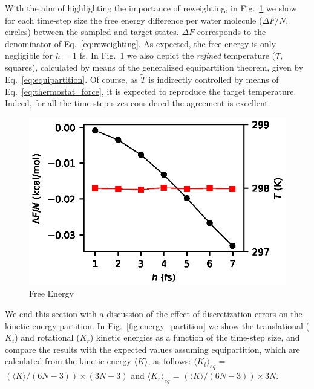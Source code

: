 \documentclass[
journal=jctcce,
layout=twocolumn
]{achemso}
\newcommand{\refined}[1]{\widetilde{#1}}
\begin{document}
With the aim of highlighting the importance of reweighting, in Fig.~\ref{fig:free_energy} we show for each time-step size the free energy difference per water molecule ($\Delta F/N$, circles) between the sampled and target states.
$\Delta F$ corresponds to the denominator of Eq.~\ref{eq:reweighting}.
As expected, the free energy is only negligible for $h$ = 1 fs.
In Fig.~\ref{fig:free_energy} we also depict the \textit{refined} temperature ($\refined{T}$, squares), calculated by means of the generalized equipartition theorem, given by Eq.~\ref{eq:equipartition}.
Of course, as $\refined{T}$ is indirectly controlled by means of Eq.~\ref{eq:thermostat_force}, it is expected to reproduce the target temperature.
Indeed, for all the time-step sizes considered the agreement is excellent.

\begin{figure}
	\includegraphics{Figures/Free_Energy.eps}
	\caption{Free Energy}
	\label{fig:free_energy}
\end{figure}

We end this section with a discussion of the effect of discretization errors on the kinetic energy partition.
In Fig.~\ref{fig:energy_partition} we show the translational ($K_t$) and rotational ($K_r$) kinetic energies as a function of the time-step size, and compare the results with the expected values assuming equipartition, which are calculated from the kinetic energy $\langle K \rangle$, as follows: $\langle K_t \rangle_{eq}$ = $(\langle K \rangle /(6N -3)) \times (3N - 3)$ and $\langle K_r \rangle_{eq}$ = $(\langle K \rangle /(6N -3)) \times 3N$.
\end{document}

